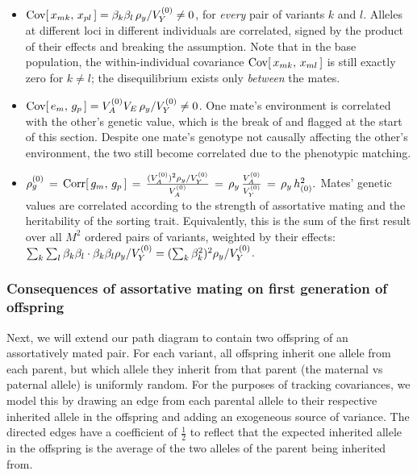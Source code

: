 \documentclass[12pt]{article}
\begin{document}
\begin{itemize}
    \item $\mathrm{Cov}[\,x_{mk},\, x_{pl}\,] = \beta_k\beta_l\,\rho_y/V_Y^{(0)} \neq 0$, for \emph{every} pair of variants $k$ and $l$.
    Alleles at different loci in different individuals are correlated, signed by the product of their effects and breaking the  assumption.
    Note that in the base population, the within-individual covariance $\mathrm{Cov}[\,x_{mk},\, x_{ml}\,]$ is still exactly zero for $k \neq l$; the disequilibrium exists only \emph{between} the mates.
    \item $\mathrm{Cov}[\,e_m,\, g_p\,] = V_A^{(0)} V_E \,\rho_y/V_Y^{(0)} \neq 0$.
    One mate's environment is correlated with the other's genetic value, which is the break of  and  flagged at the start of this section.
    Despite one mate's genotype not causally affecting the other's environment, the two still become correlated due to the phenotypic matching.
    \item $\rho_g^{(0)} \,=\, \mathrm{Corr}[\,g_m,\, g_p\,] \,=\, \frac{(V_A^{(0)})^2 \rho_y/V_Y^{(0)}}{V_A^{(0)}} \,=\, \rho_y\,\frac{V_A^{(0)}}{V_Y^{(0)}} \,=\, \rho_y\,h^2_{(0)} . $
    Mates' genetic values are correlated according to the strength of assortative mating and the heritability of the sorting trait.
    Equivalently, this is the sum of the first result over all $M^2$ ordered pairs of variants, weighted by their effects: $\sum_{k}\sum_{l}\beta_k\beta_l \cdot \beta_k\beta_l\rho_y/V_Y^{(0)} = (\sum_k \beta_k^2)^2\rho_y/V_Y^{(0)}$.
\end{itemize}

\subsubsection{Consequences of assortative mating on first generation of offspring}
Next, we will extend our path diagram to contain two offspring of an assortatively mated pair.
For each variant, all offspring inherit one allele from each parent, but which allele they inherit from that parent (the maternal vs paternal allele) is uniformly random.
For the purposes of tracking covariances, we model this by drawing an edge from each parental allele to their respective inherited allele in the offspring and adding an exogeneous source of variance.
The directed edges have a coefficient of $\tfrac12$ to reflect that the expected inherited allele in the offspring is the average of the two alleles of the parent being inherited from.
\end{document}
